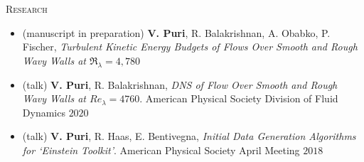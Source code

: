 \documentclass[10pt]{article}
\begin{document}
\vspace{-1.5em}
\begin{multicols}{2}
\textsc{Research}
\columnbreak

\vspace{-1.75em}
\begin{itemize}[label= ,leftmargin= 1.0em]
    \setlength{\itemindent}{-1.0em}
    \setlength\itemsep{-0.25em}
    \item (manuscript in preparation) \textbf{V. Puri}, R. Balakrishnan, A. Obabko, P. Fischer, \textit{Turbulent Kinetic Energy Budgets of Flows Over Smooth and Rough Wavy Walls at $\Re_\lambda=4,780$}
    \item (talk) \textbf{V. Puri}, R. Balakrishnan, \textit{DNS of Flow Over Smooth and Rough Wavy Walls at $\mathit{Re}_\lambda=4760$}. American Physical Society Division of Fluid Dynamics $2020$
    \item (talk) \textbf{V. Puri}, R. Haas, E. Bentivegna, \textit{Initial Data Generation Algorithms for `Einstein Toolkit'}. American Physical Society April Meeting $2018$
\end{itemize}
\vspace{-2.0em}

\end{multicols}
\vspace{-1.5em}
\end{document}
